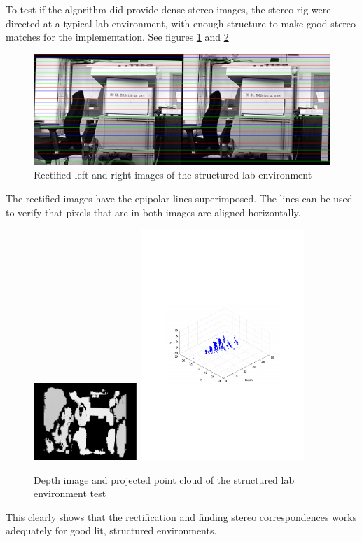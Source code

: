 To test if the algorithm did provide dense stereo images, the stereo rig were directed at
a typical lab environment, with enough structure to make good stereo matches for the
implementation. See figures \ref{chap8:fig-structured-test-rectified} and
\ref{chap8:fig-structured-test-depth}
\begin{figure}[htbp]
    \centering
    \includegraphics[width=\textwidth]{pics/structure-test-rectified}
    \caption{Rectified left and right images of the structured lab environment}
    \label{chap8:fig-structured-test-rectified}
\end{figure}
The rectified images have the epipolar lines superimposed. The lines can be used to verify
that pixels that are in both images are aligned horizontally.
\begin{figure}[htbp]
    \centering
    \includegraphics[width=0.35\textwidth]{pics/structure-test-depth}
    \includegraphics[width=0.55\textwidth]{pics/structured-test3d}
    \caption{Depth image and projected point cloud of the structured lab environment test}
    \label{chap8:fig-structured-test-depth}
\end{figure}
This clearly shows that the rectification and finding stereo correspondences
works adequately for good lit, structured environments. 


